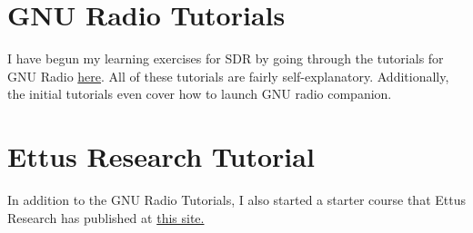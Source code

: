 \documentclass{article}
\begin{document}
\section{GNU Radio Tutorials}
I have begun my learning exercises for SDR by going through the 
tutorials for GNU Radio \href{https://wiki.gnuradio.org/index.php?title=Tutorials}{here}.
All of these tutorials are fairly self-explanatory. Additionally, the initial tutorials even
cover how to launch GNU radio companion.

\section{Ettus Research Tutorial}
In addition to the GNU Radio Tutorials, I also started a starter course that Ettus 
Research has published at \href{https://kb.ettus.com/images/4/47/Workshop_GnuRadio_Slides_20190507.pdf}{this site.}
\end{document}
